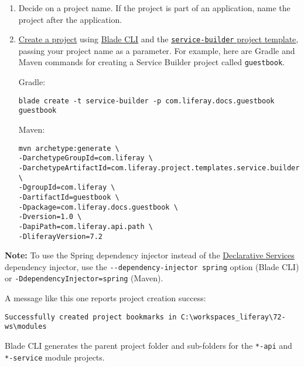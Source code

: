 \begin{enumerate}
\def\labelenumi{\arabic{enumi}.}
\item
  Decide on a project name. If the project is part of an application,
  name the project after the application.
\item
  \href{/docs/7-2/reference/-/knowledge_base/r/creating-a-project}{Create
  a project} using
  \href{/docs/7-2/reference/-/knowledge_base/r/blade-cli}{Blade CLI} and
  the
  \href{/docs/7-2/reference/-/knowledge_base/r/using-the-service-builder-template}{\texttt{service-builder}
  project template}, passing your project name as a parameter. For
  example, here are Gradle and Maven commands for creating a Service
  Builder project called \texttt{guestbook}.

  Gradle:

\begin{verbatim}
blade create -t service-builder -p com.liferay.docs.guestbook guestbook
\end{verbatim}

  Maven:

\begin{verbatim}
mvn archetype:generate \
-DarchetypeGroupId=com.liferay \
-DarchetypeArtifactId=com.liferay.project.templates.service.builder \
-DgroupId=com.liferay \
-DartifactId=guestbook \
-Dpackage=com.liferay.docs.guestbook \
-Dversion=1.0 \
-DapiPath=com.liferay.api.path \
-DliferayVersion=7.2
\end{verbatim}
\end{enumerate}

\noindent\hrulefill

\textbf{Note:} To use the Spring dependency injector instead of the
\href{/docs/7-2/frameworks/-/knowledge_base/f/declarative-services}{Declarative
Services} dependency injector, use the
\texttt{-\/-dependency-injector\ spring} option (Blade CLI) or
\texttt{-DdependencyInjector=spring} (Maven).

\noindent\hrulefill

A message like this one reports project creation success:

\begin{verbatim}
Successfully created project bookmarks in C:\workspaces_liferay\72-ws\modules
\end{verbatim}

Blade CLI generates the parent project folder and sub-folders for the
\texttt{*-api} and \texttt{*-service} module projects.

